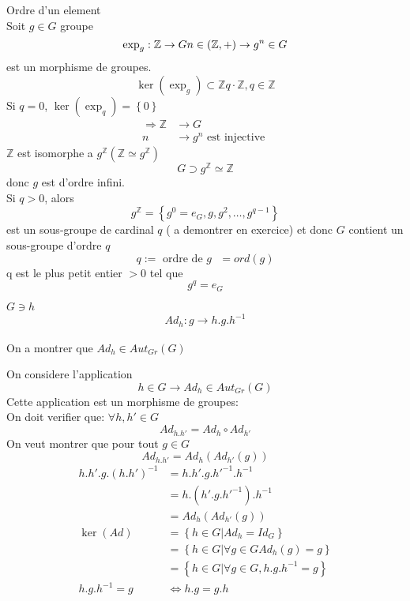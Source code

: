 \documentclass[../main.tex]{subfiles}
\begin{document}
\begin{exemple}
Ordre d'un element\\
Soit $g \in G$ groupe
\[ 
\exp_g: \mathbb{Z} \to G\\
n \in (  \mathbb{Z}, +) \to g^{n} \in G
\]
est un morphisme de groupes.
\[ 
 \ker(\exp_g) \subset \mathbb{Z}
 q \cdot \mathbb{Z}, q \in \mathbb{Z}
\]
Si $q=0$, $\ker(\exp_q) = \left\{ 0 \right\} $
\begin{align*}
	\Rightarrow \mathbb{Z} &\to G\\
	n &\to g^{n} \text{ est injective } 
\end{align*}
$\mathbb{Z}$ est isomorphe a $g^{\mathbb{Z}} (\mathbb{Z} \simeq g^{\mathbb{Z}})$
\[ 
G \supset g^{\mathbb{Z}} \simeq \mathbb{Z}
\]
donc $g$ est d'ordre infini.\\
Si $q>0$, alors 
\[ 
g^{\mathbb{Z}} = \left\{ g^{0} = e_G, g, g^{2}, \ldots, g^{q-1} \right\} 
\]
est un sous-groupe de cardinal $q$ ( a demontrer en exercice)
et donc $G$ contient un sous-groupe d'ordre $q$ 
\[ 
	q := \text{ ordre de $g$ } = ord(g)
\]
q est le plus petit entier $>0$ tel que
\[ 
g^{q} = e_G
\]




\end{exemple}
\begin{exemple}[Conjugaison]
$G \ni h$ 
\begin{align*}
Ad_h: g \to h .g .h^{-1}
\end{align*}

On a montrer que $Ad_h \in Aut_{Gr} ( G)$

\end{exemple}
On considere l'application
\[ 
	h \in G \to Ad_h \in Aut_{Gr} ( G)
\]
Cette application est un morphisme de groupes:\\
On doit verifier que: $\forall h,h' \in G$ 
\[ 
	Ad_{h.h'} =Ad_{h} \circ Ad_{h'}
\]
On veut montrer que pour tout $g\in G$ 
\[ 
	Ad_{h.h'} = Ad_h(Ad_{h'} ( g))
\]
\begin{align*}
	h.h'.g.(h.h')^{-1} &=  h.h'.g .h'^{-1} .h^{-1}\\
			   &= h.(h'.g.h'^{-1}).h^{-1}\\
			   &= Ad_h(Ad_{h'} ( g))\\
	\ker ( Ad ) &= \left\{ h \in G \vert Ad_h = Id_G \right\} \\
		    &= \left\{ h \in G \vert \forall g \in G Ad_h(g) = g \right\} \\
		    &= \left\{ h \in G \vert \forall g \in G, h.g.h^{-1}=g\right\}\\
	h.g.h^{-1} =g & \iff h.g= g.h
\end{align*}
\end{document}
